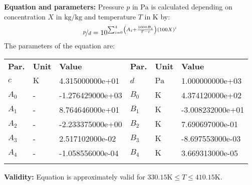 \textbf{Equation and parameters:}
\newline
%
Pressure $p$ in $\si{\pascal}$ is calculated depending on concentration $X$ in $\si{\kilogram\per\kilogram}$ and  temperature $T$ in $\si{\kelvin}$ by:
%
\begin{equation*}
\nicefrac{p}{d} = 10 ^ { \sum_{i=0}^{4} \left( A_i + \frac{1000 B_i}{T - c} \right) \left( 100 X \right) ^{i}}
\end{equation*}
%
The parameters of the equation are:
%
\begin{longtable}[l]{lll|lll}
\toprule
\addlinespace
\textbf{Par.} & \textbf{Unit} & \textbf{Value} &	\textbf{Par.} & \textbf{Unit} & \textbf{Value} \\
\addlinespace
\midrule
\endhead

\bottomrule
\endfoot
\bottomrule
\endlastfoot
\addlinespace

$c$ & $\si{\kelvin}$ & 4.315000000e+01 & $d$ & $\si{\pascal}$ & 1.000000000e+03 \\
$A_0$ & - & -1.276429000e+03 & $B_0$ & $\si{\kelvin}$ & 4.374120000e+02 \\
$A_1$ & - & 8.764646000e+01 & $B_1$ & $\si{\kelvin}$ & -3.008232000e+01 \\
$A_2$ & - & -2.233375000e+00 & $B_2$ & $\si{\kelvin}$ & 7.690697000e-01 \\
$A_3$ & - & 2.517102000e-02 & $B_3$ & $\si{\kelvin}$ & -8.697553000e-03 \\
$A_4$ & - & -1.058556000e-04 & $B_4$ & $\si{\kelvin}$ & 3.669313000e-05 \\

\addlinespace\end{longtable}

\textbf{Validity:}
\newline
Equation is approximately valid for $330.15 \si{\kelvin} \leq T \leq 410.15 \si{\kelvin}$.
\newline

